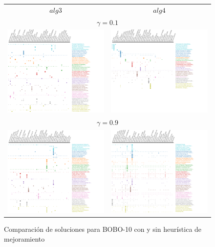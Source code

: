\begin{figure}[H]
	\centering
	\begin{tabular}{cc}
		$alg3$ & $alg4$\vspace{0.5cm}\\
		\multicolumn{2}{c}{$\gamma=0.1$}\\
		\includegraphics[width=0.45\linewidth]{img/gamma-01-alg-3.png}&
		\includegraphics[width=0.45\linewidth]{img/gamma-01-alg-4.png}\vspace{1cm}\\
		\multicolumn{2}{c}{$\gamma=0.9$}\\
		\includegraphics[width=0.45\linewidth]{img/gamma-09-alg-3.png}&
		\includegraphics[width=0.45\linewidth]{img/gamma-09-alg-4.png}\\
	\end{tabular}
	\caption{Comparación de soluciones para BOBO-10 con y sin heurística de mejoramiento}
	\label{res:bobo}
\end{figure}

